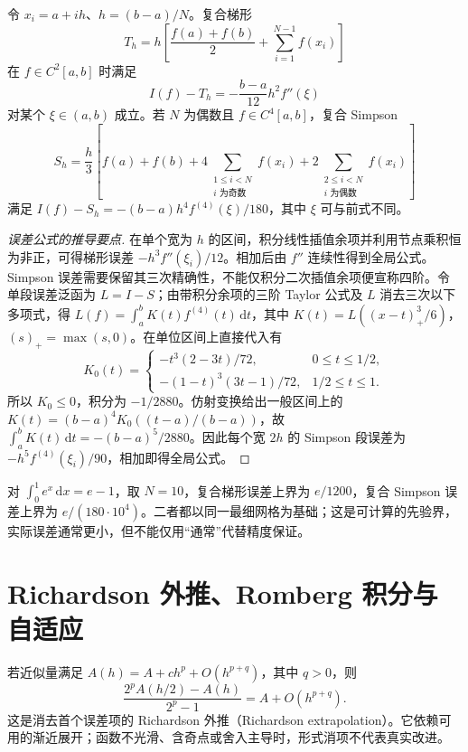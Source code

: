 \documentclass[UTF8,12pt,a4paper,fontset=fandol]{ctexbook}
\begin{document}
\begin{theorem}
\label{thm:na-composite-quadrature}
令 $x_i=a+ih$、$h=(b-a)/N$。复合梯形
\[
 T_h=h\left[\frac{f(a)+f(b)}2+\sum_{i=1}^{N-1}f(x_i)\right]
\]
在 $f\in C^2[a,b]$ 时满足
\[
 I(f)-T_h=-\frac{b-a}{12}h^2f''(\xi)
\]
对某个 $\xi\in(a,b)$ 成立。若 $N$ 为偶数且 $f\in C^4[a,b]$，复合 Simpson
\[
 S_h=\frac h3\left[f(a)+f(b)+4\sum_{\substack{1\le i<N\\i\text{ 为奇数}}}f(x_i)
 +2\sum_{\substack{2\le i<N\\i\text{ 为偶数}}}f(x_i)\right]
\]
满足 $I(f)-S_h=-(b-a)h^4f^{(4)}(\xi)/180$，其中 $\xi$ 可与前式不同。
\end{theorem}
\begin{proof}[误差公式的推导要点]
在单个宽为 $h$ 的区间，积分线性插值余项并利用节点乘积恒为非正，可得梯形误差 $-h^3f''(\xi_i)/12$。相加后由 $f''$ 连续性得到全局公式。Simpson 误差需要保留其三次精确性，不能仅积分二次插值余项便宣称四阶。令单段误差泛函为 $L=I-S$；由带积分余项的三阶 Taylor 公式及 $L$ 消去三次以下多项式，得 $L(f)=\int_a^b K(t)f^{(4)}(t)\,\mathrm dt$，其中 $K(t)=L((x-t)_+^3/6)$，$(s)_+=\max(s,0)$。在单位区间上直接代入有
\[
 K_0(t)=\begin{cases}
 -t^3(2-3t)/72,&0\le t\le1/2,\\
 -(1-t)^3(3t-1)/72,&1/2\le t\le1.
 \end{cases}
\]
所以 $K_0\le0$，积分为 $-1/2880$。仿射变换给出一般区间上的 $K(t)=(b-a)^4K_0((t-a)/(b-a))$，故 $\int_a^bK(t)\,\mathrm dt=-(b-a)^5/2880$。因此每个宽 $2h$ 的 Simpson 段误差为 $-h^5f^{(4)}(\xi_i)/90$，相加即得全局公式。
\end{proof}

\begin{example}[带确定误差界的积分]
对 $\int_0^1e^x\,\mathrm dx=e-1$，取 $N=10$，复合梯形误差上界为 $e/1200$，复合 Simpson 误差上界为 $e/(180\cdot10^4)$。二者都以同一最细网格为基础；这是可计算的先验界，实际误差通常更小，但不能仅用“通常”代替精度保证。
\end{example}

\section{Richardson 外推、Romberg 积分与自适应}
\label{sec:na-richardson}
若近似量满足 $A(h)=A+ch^p+O(h^{p+q})$，其中 $q>0$，则
\begin{equation}
 \frac{2^pA(h/2)-A(h)}{2^p-1}=A+O(h^{p+q}).
 \label{eq:na-richardson}
\end{equation}
这是消去首个误差项的 Richardson 外推（Richardson extrapolation）。它依赖可用的渐近展开；函数不光滑、含奇点或舍入主导时，形式消项不代表真实改进。
\end{document}
